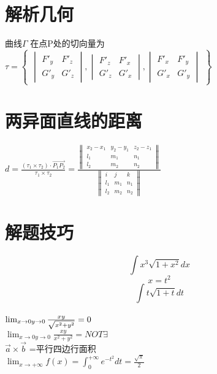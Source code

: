 \documentclass[UTF8]{ctexart}
\begin{document}
\section{解析几何}
曲线$\Gamma $ 在点P处的切向量为
$ \tau =
\begin{Bmatrix}

\begin{vmatrix}
F'_y & F'_z \\
G'_y & G'_z
\end{vmatrix}
,
\begin{vmatrix}
F'_z & F'_x \\
G'_z & G'_x
\end{vmatrix}
,
\begin{vmatrix}
F'_x & F'_y \\
G'_x & G'_y 
\end{vmatrix}
\end{Bmatrix}
$

\section{两异面直线的距离}
$ d= \frac{ (\tau_1 \times \tau_2)\cdot \overrightarrow{P_1 P_2}}{\tau_1 \times \tau_2} = \frac{\begin{Vmatrix}
x_2-x_1 & y_2-y_1 & z_2-z_1 \\
l_1 & m_1 & n_1 \\
l_2 & m_2 & n_2 
\end{Vmatrix}}{\begin{Vmatrix}
  i & j & k \\
  l_1 & m_1 & n_1 \\
  l_2 & m_2 & n_2 
\end{Vmatrix}}
$

\section{解题技巧}
$$ \int x^3 \sqrt{1+x^2} dx$$
$$ x= t^2 $$
$$ \int t \sqrt{1+t} dt $$
\\
$\lim_{x\rightarrow 0 \\ y \rightarrow 0} \frac{xy}{\sqrt{x^2+y^2}}=0$ \\
$\lim_{x\rightarrow 0 y \rightarrow 0} \frac{xy}{x^2+y^2} = NOT \exists$
\\
$\overrightarrow{a}\times \overrightarrow{b}$ =平行四边行面积
\\
$ \lim_{x \rightarrow + \infty } f(x) = \int_0^{+ \infty } e^{-t^2} dt = \frac{\sqrt{\pi}}{2}$
\end{document}
